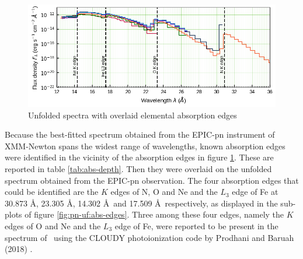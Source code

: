     		\begin{figure}[!htb]
		        \centering
		        \includegraphics[width=\textwidth]{images/eufspec/mr-vel-uf-ang_abs-edge.png}
		        \caption{Unfolded spectra with overlaid elemental absorption edges}
		        \label{fig:all-uf:abs-edges}
		    \end{figure}
		    
		    Because the best-fitted spectrum obtained from the EPIC-pn instrument of XMM-Newton spans the widest range of wavelengths, known absorption edges \cite{bearden1967reevaluation,juett2006high} were identified in the vicinity of the absorption edges in figure \ref{fig:all-uf:abs-edges}. These are reported in table \ref{tab:abs-depth}. Then they were overlaid on the unfolded spectrum obtained from the EPIC-pn observation. The four absorption edges that could be identified are the $K$ edges of N, O and Ne and the $L_3$ edge of Fe at 30.873 \AA, 23.305 \AA, 14.302 \AA\ and 17.509 \AA\ respectively, as displayed in the sub-plots of figure \ref{fig:pn-uf:abs-edges}. Three among these four edges, namely the $K$ edges of O and Ne and the $L_3$ edge of Fe, were reported to be present in the spectrum of \source\ using the CLOUDY photoionization code by Prodhani and Baruah (2018) \cite{prodhani2018galactic}.
		    
